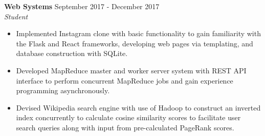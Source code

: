 \documentclass[overlapped]{res}
\begin{document}
\begin{resume}

      \textbf{Web Systems} \hfill September 2017 - December 2017 \\
                  {\sl Student}%
                  \begin{itemize}  \itemsep -2pt %
                    \item Implemented Instagram clone with basic functionality 
                    to gain familiarity with the Flask and React frameworks, 
                    developing web pages via templating, 
                    and database construction with SQLite.
                    \item Developed MapReduce master and worker server system 
                    with REST API interface to perform concurrent MapReduce jobs
                    and gain experience programming asynchronously.
                    \item Devised Wikipedia search engine with use of Hadoop 
                    to construct an inverted index concurrently
                    to calculate cosine similarity scores 
                    to facilitate user search queries
                    along with input from pre-calculated PageRank scores.
                  \end{itemize}




\end{resume}
\end{document}
